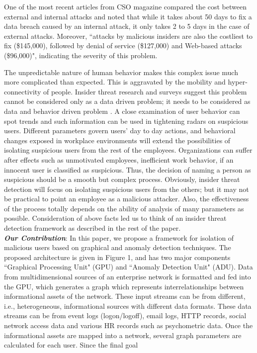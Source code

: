 \documentclass[conference,draftclsnofoot,onecolumn]{IEEEtran}%
\begin{document}
One of the most recent articles from CSO magazine \cite{CSOstaff2016} compared the cost between external and internal attacks and noted that while it takes about 50 days to fix a data breach caused by an internal attack, it only takes 2 to 5 days in the case of external attacks. Moreover, ``attacks by malicious insiders are also the costliest to fix (\$145,000), followed by denial of service (\$127,000) and Web-based attacks (\$96,000)", indicating the severity of this problem. 
 
The unpredictable nature of human behavior makes this complex issue much more complicated than expected. This is aggravated by the mobility and hyper-connectivity of people. Insider threat research and surveys suggest this problem cannot be considered only as a data driven problem; it needs to be considered as data and behavior driven problem \cite{CappelliTheCERT2012}. A close examination of user behavior can spot trends and such information can be used in tightening radars on suspicious users. Different parameters govern users' day to day actions, and behavioral changes exposed in workplace environments will extend the possibilities of isolating suspicious users from the rest of the employees. Organizations can suffer after effects such as unmotivated employees, inefficient work behavior, if an innocent user is classified as suspicious. Thus, the decision of naming a person as suspicious should be a smooth but complex process. Obviously, insider threat detection will focus on isolating suspicious users from the others; but it may not be practical to point an employee as a malicious attacker. Also, the effectiveness of the process totally depends on the ability of analysis of many parameters as possible. Consideration of above facts led us to think of an insider threat detection framework as described in the rest of the paper.\\ 
\noindent
\textbf{\textit{Our Contribution}}:
In this paper, we propose a framework for isolation of malicious users based on graphical and anomaly detection techniques. The proposed architecture is given in Figure 1, and has two major components ``Graphical Processing Unit" (GPU) and ``Anomaly Detection Unit" (ADU). Data from multidimensional sources of an enterprise network is formatted and fed into the GPU, which generates a graph which represents interrelationships between informational assets of the network. These input streams can be from different, i.e., heterogeneous, informational sources with different data formats. These data streams can be from event logs (logon/logoff), email logs, HTTP records, social network access data and various HR records such as psychometric data. Once the informational assets are mapped into a network, several graph parameters are calculated for each user. Since the final goal %
\end{document}
